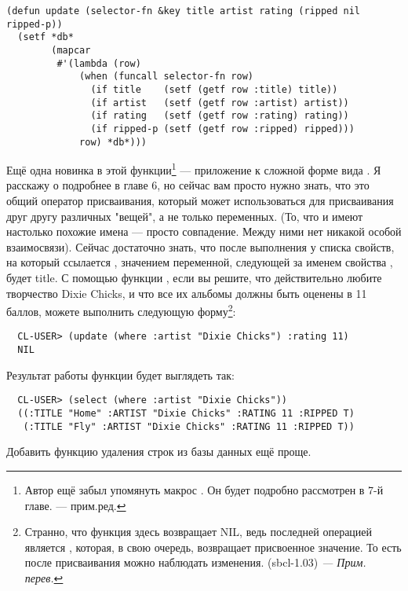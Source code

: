 \begin{lstlisting}
(defun update (selector-fn &key title artist rating (ripped nil ripped-p))
  (setf *db*
        (mapcar
         #'(lambda (row)
             (when (funcall selector-fn row)
               (if title    (setf (getf row :title) title))
               (if artist   (setf (getf row :artist) artist))
               (if rating   (setf (getf row :rating) rating))
               (if ripped-p (setf (getf row :ripped) ripped)))
             row) *db*)))
\end{lstlisting}

Ещё одна новинка в этой функции\footnote{Автор ещё забыл упомянуть макрос . Он
  будет подробно рассмотрен в 7-й главе. --- прим.ред.} --- приложение  к
сложной форме вида . Я расскажу о  подробнее в главе 6,
но сейчас вам просто нужно знать, что это общий оператор присваивания, который может
использоваться для присваивания друг другу различных "вещей", а не только переменных. (То,
что  и  имеют настолько похожие имена --- просто совпадение. Между
ними нет никакой особой взаимосвязи). Сейчас достаточно знать, что после выполнения
 у списка свойств, на который ссылается ,
значением переменной, следующей за именем свойства , будет title. С помощью
функции , если вы решите, что действительно любите творчество Dixie Chicks, и
что все их альбомы должны быть оценены в 11 баллов, можете выполнить следующую
форму\footnote{Странно, что функция  здесь возвращает NIL, ведь последней
  операцией является , которая, в свою очередь, возвращает
  присвоенное значение. То есть после присваивания можно наблюдать изменения. (sbcl-1.03)
  \textit{--- Прим. перев.}}:

\begin{verbatim}
  CL-USER> (update (where :artist "Dixie Chicks") :rating 11)
  NIL
\end{verbatim}

Результат работы функции будет выглядеть так:

\begin{verbatim}
  CL-USER> (select (where :artist "Dixie Chicks"))
  ((:TITLE "Home" :ARTIST "Dixie Chicks" :RATING 11 :RIPPED T)
   (:TITLE "Fly" :ARTIST "Dixie Chicks" :RATING 11 :RIPPED T))
\end{verbatim}

Добавить функцию удаления строк из базы данных ещё проще.


